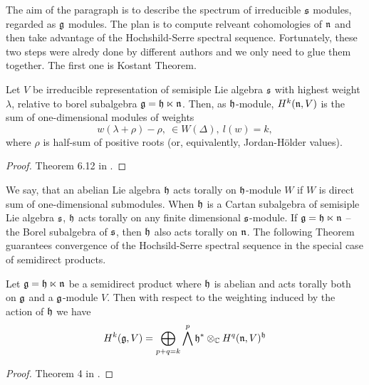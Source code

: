 The aim of the paragraph is to describe the spectrum of irreducible $\mathfrak{s}$ modules, regarded
as $\mathfrak{g}$ modules. The plan is to compute relveant cohomologies of $\mathfrak{n}$ and then take advantage
of the Hochshild-Serre spectral sequence. Fortunately, these two steps were alredy done by
different authors and we only need to glue them together. The first one is Kostant Theorem.
\begin{theorem}[Kostant]
   Let $V$ be irreducible representation of semisiple Lie algebra $\mathfrak{s}$ with highest weight
   $\lambda$, relative to borel subalgebra $\mathfrak{g} = \mathfrak{h} \ltimes \mathfrak{n}$. Then, as $\mathfrak{h}$-module,
   $H^k(\mathfrak{n}, V)$ is the sum of one-dimensional modules of weights
   \[
       w(\lambda + \rho) - \rho,~\in W(\Delta), ~l(w) = k,
   \]
   where $\rho$ is half-sum of positive roots (or, equivalently, Jordan-H\"older values).
\end{theorem}
\begin{proof}
    Theorem 6.12 in \cite{knapp}.
\end{proof}
We say, that an abelian Lie algebra $\mathfrak{h}$ acts torally on $\mathfrak{h}$-module $W$ if $W$ is direct sum
of one-dimensional submodules. When $\mathfrak{h}$ is a Cartan subalgebra of semisiple Lie algebra
$\mathfrak{s}$, $\mathfrak{h}$ acts torally on any finite dimensional $\mathfrak{s}$-module. If $\mathfrak{g} = \mathfrak{h} \ltimes
\mathfrak{n}$ -- the Borel subalgebra of $\mathfrak{s}$, then $\mathfrak{h}$ also acts torally on $\mathfrak{n}$. The following
Theorem guarantees convergence of the Hochsild-Serre spectral sequence in the special case of
semidirect products.
\begin{theorem}
    Let $\mathfrak{g}=\mathfrak{h}\ltimes\mathfrak{n}$ be a semidirect product where $\mathfrak{h}$ is abelian and acts torally
    both on $\mathfrak{g}$ and a $\mathfrak{g}$-module $V$. Then with respect to the weighting induced by the
    action of $\mathfrak{h}$ we have 
    \begin{equation} \label{t:coll:1}
        H^k(\mathfrak{g}, V) = \bigoplus_{p + q = k} \bigwedge^p\mathfrak{h}^* \otimes_{\mathbb{C}} H^q(\mathfrak{n}, V)^{\mathfrak{h}}
    \end{equation} 
\end{theorem}
\begin{proof}
    Theorem 4 in \cite{coll}. 
\end{proof}

